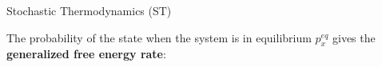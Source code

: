 \documentclass[final]{beamer}
\newlength{\colwidth}
\begin{document}
\begin{frame}[t]
\begin{columns}[t]
\begin{column}{\colwidth}
\begin{block}{Stochastic Thermodynamics (ST)}
\end{block}
\begin{block}{}
The probability of the state when the system is in equilibrium $p_x^{eq}$ gives the {\bf generalized free energy rate}\cite{Qian_2021}:


\end{block}
\end{column}
\end{columns}
\end{frame}
\end{document}
